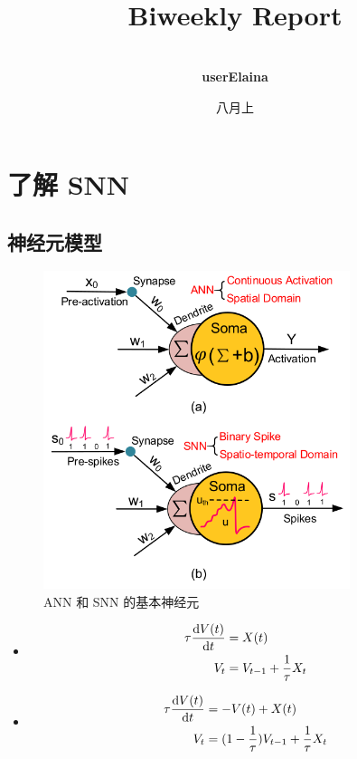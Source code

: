 \documentclass[a4paper]{article}
\title{
    \vspace*{1.5in}
     \\
    \vspace*{1in}
    \textbf{\huge Biweekly Report}
    \vspace{0.5in}
}
\author{ \\
    \textbf{userElaina} \\
    \vspace*{1in}
}
\date{八月上}
\begin{document}
\maketitle
\tableofcontents
\thispagestyle{empty}
\newpage


\section{了解 SNN}

\subsection{神经元模型}

\begin{figure}[hb]
    \centering
    \includegraphics[width=0.8\textwidth]{figures/s1.png}
    \caption{ANN 和 SNN 的基本神经元}
    \label{fig:s1}
\end{figure}

\begin{itemize}
    \item\begin{equation*}
        \begin{aligned}
            \tau\frac{{\rm d}V(t)}{{\rm d}t} &= X(t) \\
            V_t &= V_{t-1}+\frac{1}{\tau}X_t
        \end{aligned}
    \end{equation*}
    \item\begin{equation*}
        \begin{aligned}
            \tau\frac{{\rm d}V(t)}{{\rm d}t} &= -V(t)+X(t) \\
            V_t &= (1-\frac{1}{\tau})V_{t-1}+\frac{1}{\tau} X_t
        \end{aligned}
    \end{equation*}
\end{itemize}
\end{document}
